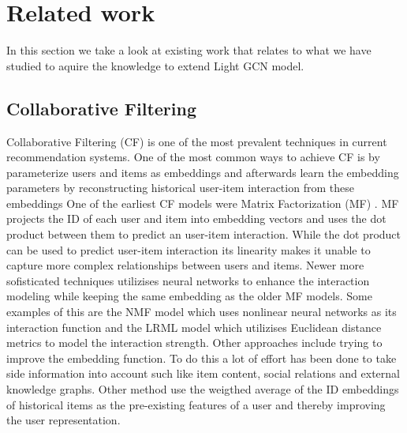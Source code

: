 \section{Related work}
In this section we take a look at existing work that relates to what we have studied to aquire the knowledge to extend Light GCN model.

\subsection{Collaborative Filtering}
Collaborative Filtering (CF) is one of the most prevalent techniques in current recommendation systems\cite{YT_rec,NGCF_2019,Pint_rec,COL_MEM_NET}.
One of the most common ways to achieve CF is by parameterize users and items as embeddings and afterwards learn the embedding parameters by reconstructing historical user-item interaction from these embeddings\cite{NGCF_2019}
One of the earliest CF models were Matrix Factorization (MF) \cite{Matrix-factorization-techniques, BAY_PER_RAN}.
MF  projects the ID of each user and item into embedding vectors and uses the dot product between them to predict an user-item interaction.
While the dot product can be used to predict user-item interaction its linearity makes it unable to capture more complex relationships between users and items.
Newer more sofisticated techniques utilizises neural networks to enhance the interaction modeling while keeping the same embedding as the older MF models.
Some examples of this are the NMF model\cite{NEU_COL_FIL} which uses nonlinear neural networks as its interaction function and the LRML model\cite{LAT_REL_MET} which utilizises Euclidean distance metrics to model the interaction strength.
Other approaches include trying to improve the embedding function.
To do this a lot of effort has been done to take side information into account such like item content\cite{ATT_COL_FIL_MUL}, social relations\cite{REC_SOC_USE} and external knowledge graphs\cite{KGAT, KNO_GRA_REC}.
Other method use the weigthed average of the ID embeddings of historical items as the pre-existing features of a user and thereby improving the user representation\cite{SVD_PLUSPLUS,FISM}.
 
